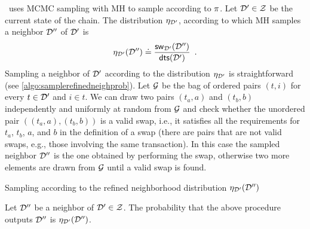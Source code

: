 \ uses MCMC sampling with MH to sample according to $\pi$. Let
$\mathcal{D}' \in \mathcal{Z}$ be the current state of the chain. The
distribution $\eta_{\mathcal{D}'}$,  according to
which MH samples a neighbor $\mathcal{D}''$ of $\mathcal{D}'$ is
\begin{equation}\label{eq:refinedneighprob} \eta_{\mathcal{D}'}(\mathcal{D}'')
\doteq \frac{\mathsf{sw}_{\mathcal{D}'}\lparen\mathcal{D}''\rparen}{\mathsf{dts}\lparen\mathcal{D}'\rparen}
\enspace. \end{equation}
Sampling a neighbor of $\mathcal{D}'$ according to the distribution
$\eta_{\mathcal{D}'}$ is straightforward (see
\cref{algo:samplerefinedneighprob}). Let $\mathcal{G}$ be the bag of ordered pairs
$(t,i)$ for every $t \in \mathcal{D}'$ and $i \in t$. We can draw two pairs $(t_a,
a)$ and $(t_b, b)$ independently and uniformly at random from $\mathcal{G}$ and
check whether the unordered pair $((t_a, a), (t_b, b))$ is a valid swap, i.e.,
it satisfies all the requirements for $t_a$, $t_b$, $a$, and $b$ in the
definition of a swap (there are pairs that are not valid swaps, e.g., those
involving the same transaction). In this case the sampled neighbor $\mathcal{D}''$
is the one obtained by performing the swap, otherwise two more elements are
drawn from $\mathcal{G}$ until a valid swap is found.

\begin{algorithm}[hb]
  \caption{Sampling according to the refined neighborhood distribution
  $\eta_{\mathcal{D}'}(\mathcal{D}'')$}\label{algo:samplerefinedneighprob}
  \DontPrintSemicolon%





\end{algorithm}

\begin{lemma}\label{lem:sampleneighbor}
  Let $\mathcal{D}''$ be a neighbor of $\mathcal{D}' \in \mathcal{Z}$. The probability
  that the above procedure outputs $\mathcal{D}''$ is
  $\eta_{\mathcal{D}'}(\mathcal{D}'')$.
\end{lemma}

